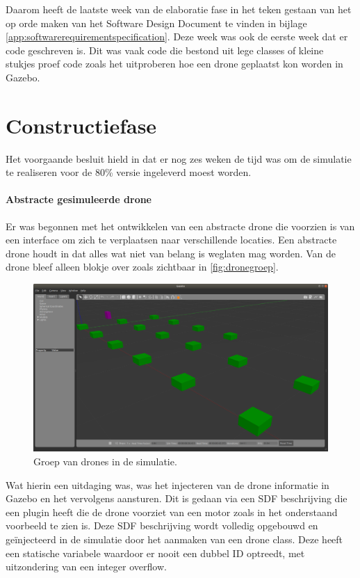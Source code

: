 \documentclass[a4paper, 11pt, oneside]{report}
\begin{document}
Daarom heeft de laatste week van de elaboratie fase in het teken gestaan van het op orde maken van het Software Design Document te vinden in bijlage  \ref{app:softwarerequirementspecification}.
Deze week was ook de eerste week dat er code geschreven is. 
Dit was vaak code die bestond uit lege classes of kleine stukjes proef code zoals het uitproberen hoe een drone geplaatst kon worden in Gazebo.

\section{Constructiefase}\label{sec:constructiefase}
Het voorgaande besluit hield in dat er nog zes weken de tijd was om de simulatie te realiseren voor de 80\% versie ingeleverd moest worden.
\paragraph{Abstracte gesimuleerde drone}
Er was begonnen met het ontwikkelen van een abstracte drone die voorzien is van een interface  om zich te verplaatsen naar verschillende locaties.
Een abstracte drone houdt in dat alles wat niet van belang is weglaten mag worden. Van de drone bleef alleen blokje over zoals zichtbaar in \autoref{fig:dronegroep}.
\begin{figure}[H]
	\begin{center}\includegraphics[width=.6\linewidth]{Afbeeldingen/dronegroep.png}\end{center}
	\caption{Groep van drones in de simulatie.}
	\label{fig:dronegroep}
\end{figure}

Wat hierin een uitdaging was, was het injecteren van de drone informatie in Gazebo en het vervolgens aansturen. Dit is gedaan via een SDF beschrijving \cite{sdf} die een plugin heeft die de drone voorziet van een motor zoals in het onderstaand voorbeeld te zien is. Deze SDF beschrijving wordt volledig opgebouwd en geïnjecteerd in de simulatie door het aanmaken van een drone class. Deze heeft een statische variabele waardoor er nooit een dubbel ID optreedt, met uitzondering van een integer overflow.
\end{document}
